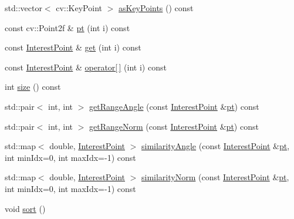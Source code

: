 \begin{DoxyCompactItemize}
std\+::vector$<$ cv\+::\+Key\+Point $>$ \hyperlink{classdefals_1_1_interest_points_ab9144ecca0091fb9acc1cdd075ef8252}{as\+Key\+Points} () const
\item 
const cv\+::\+Point2f \& \hyperlink{classdefals_1_1_interest_points_ab9c31f421438b096df5447d6ce1b02f4}{pt} (int i) const
\item 
const \hyperlink{classdefals_1_1_interest_point}{Interest\+Point} \& \hyperlink{classdefals_1_1_interest_points_a49503e93237f48b81717de04a950c685}{get} (int i) const
\item 
const \hyperlink{classdefals_1_1_interest_point}{Interest\+Point} \& \hyperlink{classdefals_1_1_interest_points_a7b8248304d7d4789c4d7b0d9d3b0cbc1}{operator\mbox{[}$\,$\mbox{]}} (int i) const
\item 
int \hyperlink{classdefals_1_1_interest_points_a5470df860636b970ab8b4425f40b2528}{size} () const
\item 
std\+::pair$<$ int, int $>$ \hyperlink{classdefals_1_1_interest_points_a5f22afcf31b278e2c57799328103c85a}{get\+Range\+Angle} (const \hyperlink{classdefals_1_1_interest_point}{Interest\+Point} \&\hyperlink{classdefals_1_1_interest_points_ab9c31f421438b096df5447d6ce1b02f4}{pt}) const
\item 
std\+::pair$<$ int, int $>$ \hyperlink{classdefals_1_1_interest_points_a27fd66925413975de0bc1d2cdbcc9af9}{get\+Range\+Norm} (const \hyperlink{classdefals_1_1_interest_point}{Interest\+Point} \&\hyperlink{classdefals_1_1_interest_points_ab9c31f421438b096df5447d6ce1b02f4}{pt}) const
\item 
std\+::map$<$ double, \hyperlink{classdefals_1_1_interest_point}{Interest\+Point} $>$ \hyperlink{classdefals_1_1_interest_points_ac7953a26838e4b9ceb0546e6ace5f161}{similarity\+Angle} (const \hyperlink{classdefals_1_1_interest_point}{Interest\+Point} \&\hyperlink{classdefals_1_1_interest_points_ab9c31f421438b096df5447d6ce1b02f4}{pt}, int min\+Idx=0, int max\+Idx=-\/1) const
\item 
std\+::map$<$ double, \hyperlink{classdefals_1_1_interest_point}{Interest\+Point} $>$ \hyperlink{classdefals_1_1_interest_points_a2ad567cec93cbf90a4585fafd835a3b6}{similarity\+Norm} (const \hyperlink{classdefals_1_1_interest_point}{Interest\+Point} \&\hyperlink{classdefals_1_1_interest_points_ab9c31f421438b096df5447d6ce1b02f4}{pt}, int min\+Idx=0, int max\+Idx=-\/1) const
\item 
void \hyperlink{classdefals_1_1_interest_points_aefaf0b9c9e265f62d05ef846fd4c9628}{sort} ()
\end{DoxyCompactItemize}

